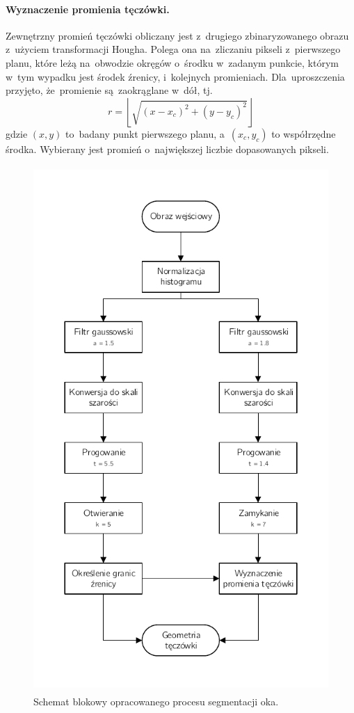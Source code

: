 \documentclass[11pt,a4paper]{article}
\begin{document}
\paragraph{Wyznaczenie promienia tęczówki.}
Zewnętrzny promień tęczówki obliczany jest z~drugiego zbinaryzowanego obrazu z~użyciem transformacji Hougha.
Polega ona na~zliczaniu pikseli z~pierwszego planu, które leżą na~obwodzie okręgów o~środku w~zadanym punkcie, którym w~tym wypadku jest środek źrenicy, i~kolejnych promieniach.
Dla~uproszczenia przyjęto, że~promienie są~zaokrąglane w~dół, tj.
$$ r = \left\lfloor \sqrt{(x - x_c)^2 + (y - y_c)^2} \right\rfloor $$
gdzie $(x, y)$ to~badany punkt pierwszego planu, a~$(x_c, y_c)$ to współrzędne środka.
Wybierany jest promień o~największej liczbie dopasowanych pikseli.

\begin{figure}
    \centering
    \includegraphics[height=20cm]{res/img/diagram.pdf}
    \caption{Schemat blokowy opracowanego procesu segmentacji oka.}
    \label{fig:block-diagram}
\end{figure}
\end{document}
